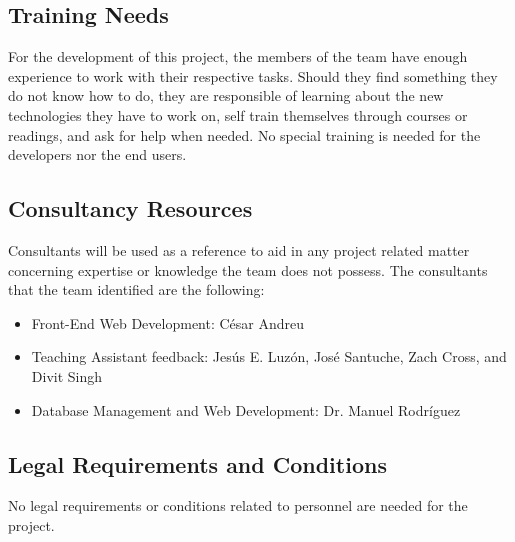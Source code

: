 \subsection{Training Needs}

For the development of this project, the members of the team have enough
experience to work with their respective tasks. Should they find something they
do not know how to do, they are responsible of learning about the new
technologies they have to work on, self train themselves through courses or
readings, and ask for help when needed. No special training is needed for the developers nor the end users.

\subsection{Consultancy Resources}

Consultants will be used as a reference to aid in any project
related matter concerning expertise or knowledge the team does not possess. The consultants that the team identified are the following:

\begin{itemize}
\item Front-End Web Development: César Andreu
\item Teaching Assistant feedback: Jesús E. Luzón, José Santuche, Zach Cross, and Divit Singh
\item Database Management and Web Development: Dr. Manuel Rodríguez
\end{itemize}

\subsection{Legal Requirements and Conditions}

No legal requirements or conditions related to
personnel are needed for the project.